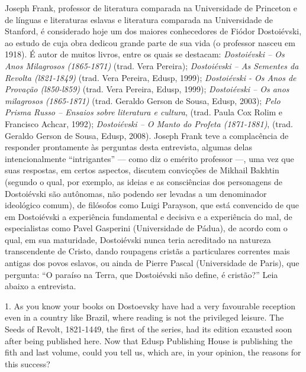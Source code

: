 Joseph Frank, professor de literatura comparada na Universidade de
Princeton e de línguas e literaturas eslavas e literatura comparada na
Universidade de Stanford, é considerado hoje um dos maiores conhecedores
de Fiódor Dostoiévski, ao estudo de cuja obra dedicou grande parte de
sua vida (o professor nasceu em 1918). É autor de muitos livros, entre
os quais se destacam: \emph{Dostoiévski -- Os Anos Milagrosos (1865-1871)}
(trad. Vera Pereira); \emph{Dostoiévski -- As Sementes da Revolta (l821-1849)}
(trad. Vera Pereira, Edusp, 1999); \emph{Dostoiévski - Os Anos de Provação
(l850-l859)} (trad. Vera Pereira, Edusp, 1999); \emph{Dostoiévski -- Os anos
milagrosos (1865-1871)} (trad. Geraldo Gerson de Sousa, Edusp,
2003); \emph{Pelo Prisma Russo -- Ensaios sobre literatura e cultura}, (trad.
Paula Cox Rolim e Francisco Achcar, 1992); \emph{Dostoiévski -- O Manto do
Profeta (1871-1881)}, (trad. Geraldo Gerson de Sousa, Edusp, 2008). Joseph
Frank teve a complacência de responder prontamente às perguntas desta
entrevista, algumas delas intencionalmente ``intrigantes'' --- como diz o
emérito professor ---, uma vez que suas respostas, em certos aspectos,
discutem convicções de Mikhail Bakhtin (segundo o qual, por exemplo, as
ideias e as consciências dos personagens de Dostoiévski são autônomas,
não podendo ser levadas a um denominador ideológico comum), de filósofos
como Luigi Parayson, que está convencido de que em Dostoiévski a
experiência fundamental e decisiva e a experiência do mal, de
especialistas como Pavel Gasperini (Universidade de Pádua), de acordo
com o qual, em sua maturidade, Dostoiévski nunca teria acreditado na
natureza transcendente de Cristo, dando roupagens cristãs a particulares
correntes mais antigas dos povos eslavos, ou ainda de Pierre Pascal
(Universidade de Paris), que pergunta: ``O paraíso na Terra, que
Dostoiévski não define, é cristão?'' Leia abaixo a entrevista.

1. As you know your books on Dostoevsky have had a very favourable
reception even in a country like Brazil, where reading is not the
privileged leisure. The Seeds of Revolt, 1821-1449, the first of the
series, had its edition exausted soon after being published here. Now
that Edusp Publishing House is publishing the fith and last volume,
could you tell us, which are, in your opinion, the reasons for this
success?

